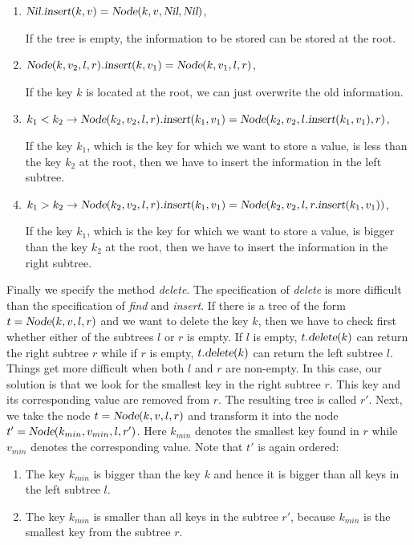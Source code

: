 \begin{enumerate}
\item $\textsl{Nil}.\textsl{insert}(k,v) = \textsl{Node}(k,v, \textsl{Nil}, \textsl{Nil})$,
  
      If the tree is empty, the information to be stored can be stored at the root.
\item $\textsl{Node}(k,v_2,l,r).\textsl{insert}(k,v_1) = \textsl{Node}(k, v_1, l, r)$,

      If the key $k$ is located at the root, we can just overwrite the old information. 
\item $k_1 < k_2 \rightarrow 
         \textsl{Node}(k_2, v_2, l, r).\textsl{insert}(k_1, v_1) = \textsl{Node}(k_2, v_2, l.\textsl{insert}(k_1, v_1), r)$,

      If the key $k_1$, which is the key for which we want to store a value, is less than the key
      $k_2$ at the root, then we have to insert the information in the left subtree.
\item $k_1 > k_2 \rightarrow 
         \textsl{Node}(k_2, v_2, l, r).\textsl{insert}(k_1, v_1) = 
         \textsl{Node}(k_2, v_2, l, r.\textsl{insert}(k_1, v_1))$,

      If the key $k_1$, which is the key for which we want to store a value, is bigger than the key
      $k_2$ at the root, then we have to insert the information in the right subtree.
\end{enumerate}
Finally we specify the method  \textsl{delete}.  The specification of \textsl{delete} is more
difficult than the specification of \textsl{find} and \textsl{insert}.
If there is a tree of the form $t =\textsl{Node}(k,v,l,r)$ and we want to delete the key $k$, then
we have to check first whether either of the subtrees  $l$ or $r$ is empty.  If $l$ is empty,
$t.\textsl{delete}(k)$ can return the right subtree  $r$ while if $r$ is empty,
$t.\textsl{delete}(k)$ can return the left subtree $l$.
Things get more difficult when both $l$ and $r$ are non-empty.  In this case,
our solution is that we look for the smallest key in the right subtree $r$.
This key and its corresponding value are removed from $r$.  The resulting tree is called $r'$.
Next, we take the node $t =\textsl{Node}(k,v,l,r)$ and transform it into the node
$t'=\textsl{Node}(k_{min},v_{min},l,r')$.  Here $k_{min}$ denotes the smallest key found in $r$ while
$v_{min}$ denotes the corresponding value.  Note that $t'$ is again ordered:
\begin{enumerate}
\item The key $k_{min}$ is bigger than the key $k$ and hence it is bigger than all keys in the left
      subtree $l$.
\item The key $k_{min}$ is smaller than all keys in the subtree  $r'$, because $k_{min}$ is the
      smallest key from the subtree $r$.
\end{enumerate}
